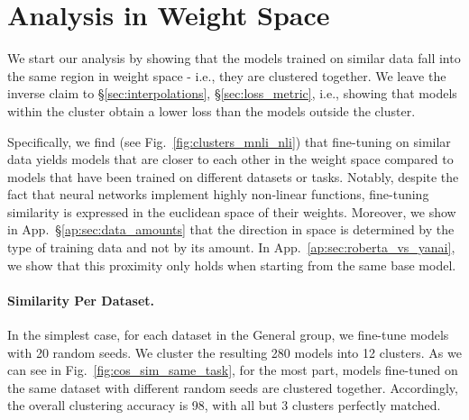 \documentclass[nohyperref]{article}
\theoremstyle{plain}
\theoremstyle{definition}
\theoremstyle{remark}
\begin{document}
\begin{figure*}[t]
\centering
\hfill
{}
\caption{Clusters of fine-tuned models on different datasets or tasks, projected by t-SNE. We find that both datasets and dataset families correspond to regions in space. In each figure, each model is represented as a dot, where the inner color is the color of the dataset/task the model was fine-tuned with and the outer color is the color of the most common dataset/task in the cluster (representing the cluster label). Datasets/tasks names are shown in legends. 
\label{fig:clusters_mnli_nli}}
\end{figure*}

\section{Analysis in Weight Space}\label{sec:analysis}

We start our analysis by showing that the models trained on similar data fall into the same region in weight space - i.e., they are clustered together.
We leave the inverse claim to  \S\ref{sec:interpolations}, \S\ref{sec:loss_metric}, i.e., showing that models within the cluster obtain a lower loss than the models outside the cluster.

Specifically, we find (see Fig.~\ref{fig:clusters_mnli_nli}) that fine-tuning on similar data yields models that are closer to each other in the weight space compared to models that have been trained on different datasets or tasks. Notably, despite the fact that neural networks implement highly non-linear functions, fine-tuning similarity is expressed in the euclidean space of their weights. Moreover, we show in App.~\S\ref{ap:sec:data_amounts} that the direction in space is determined by the type of training data and not by its amount. In App.~\ref{ap:sec:roberta_vs_yanai}, we show that this proximity only holds when starting from the same base model.

\paragraph{Similarity Per Dataset.}\label{sec:similarity_per_dataset}
In the simplest case, for each dataset in the General group, we fine-tune models with 20 random seeds. We cluster the resulting 280 models into 12 clusters.
As we can see in Fig.~\ref{fig:cos_sim_same_task}, for the most part, models fine-tuned on the same dataset with different random seeds are clustered together. Accordingly, the overall clustering accuracy is 98, with all but 3 clusters perfectly matched. %
\end{document}
